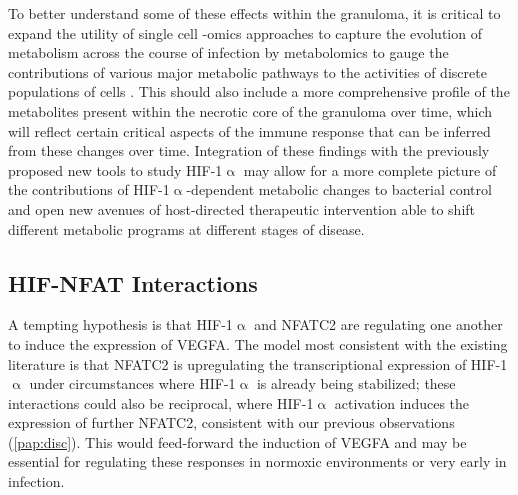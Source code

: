 To better understand some of these effects within the granuloma, it is critical to expand the utility of single cell \hyp{}omics approaches to capture the evolution of metabolism across the course of infection by metabolomics to gauge the contributions of various major metabolic pathways to the activities of discrete populations of cells \citep{Somashekar2011}. This should also include a more comprehensive profile of the metabolites present within the necrotic core of the granuloma over time, which will reflect certain critical aspects of the immune response that can be inferred from these changes over time. Integration of these findings with the previously proposed new tools to study HIF\hyp{}1$\upalpha$ may allow for a more complete picture of the contributions of HIF\hyp{}1$\upalpha$\hyp{}dependent metabolic changes to bacterial control and open new avenues of host\hyp{}directed therapeutic intervention able to shift different metabolic programs at different stages of disease.
 
\subsection{HIF\hyp{}NFAT Interactions}\label{hifnfat}

A tempting hypothesis is that HIF\hyp{}1$\upalpha$ and NFATC2 are regulating one another to induce the expression of VEGFA. The model most consistent with the existing literature is that NFATC2 is upregulating the transcriptional expression of HIF\hyp{}1$\upalpha$ under circumstances where HIF\hyp{}1$\upalpha$ is already being stabilized; these interactions could also be reciprocal, where HIF\hyp{}1$\upalpha$ activation induces the expression of further NFATC2, consistent with our previous observations (\autoref{pap:disc}). This would feed\hyp{}forward the induction of VEGFA and may be essential for regulating these responses in normoxic environments or very early in infection. 


